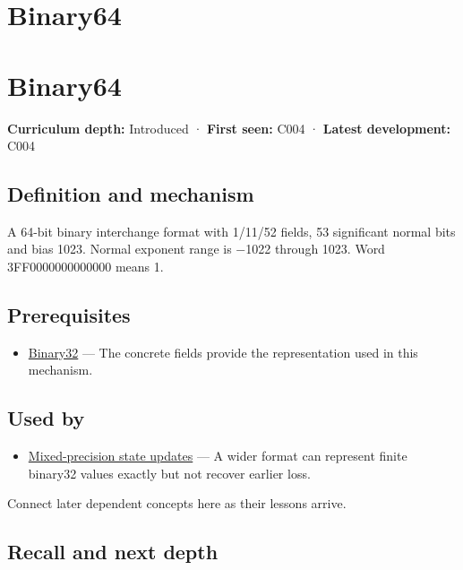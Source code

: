 \hypertarget{appendix-5078dfab64e6}{}
\section*{Binary64}
\section{Binary64}\label{binary64}

\textbf{Curriculum depth:} Introduced · \textbf{First seen:} C004 · \textbf{Latest development:} C004

\subsection{Definition and mechanism}\label{definition-and-mechanism}

A 64-bit binary interchange format with 1/11/52 fields, 53 significant normal bits and bias 1023. Normal exponent range is −1022 through 1023. Word 3FF0000000000000 means 1.

\subsection{Prerequisites}\label{prerequisites}

\begin{itemize}
\tightlist
\item
  \hyperref[appendix-5057f9ad327f]{Binary32} --- The concrete fields provide the representation used in this mechanism.
\end{itemize}

\subsection{Used by}\label{used-by}

\begin{itemize}
\tightlist
\item
  \hyperref[appendix-260182e617b7]{Mixed-precision state updates} --- A wider format can represent finite binary32 values exactly but not recover earlier loss.
\end{itemize}

Connect later dependent concepts here as their lessons arrive.

\subsection{Recall and next depth}\label{recall-and-next-depth}


